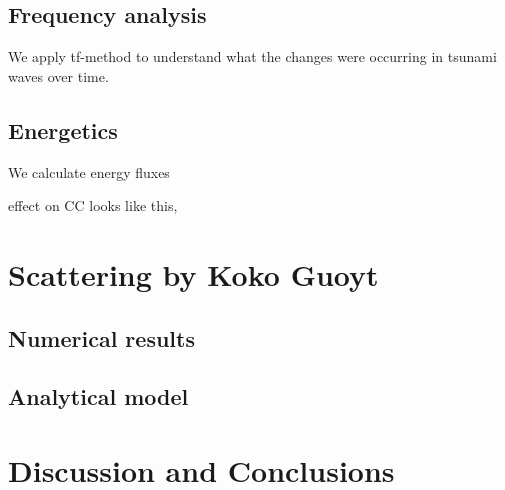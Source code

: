 \subsection{Frequency analysis}
We apply tf-method to understand what the changes were occurring in tsunami waves over time.

\subsection{Energetics}
We calculate energy fluxes
\begin{figure}
\end{figure}
effect on CC looks like this,
\begin{figure}
\end{figure}

\section{Scattering by Koko Guoyt}
\subsection{Numerical results}
\begin{figure}
\end{figure}

\subsection{Analytical model}

\section{Discussion and Conclusions}

\newpage





